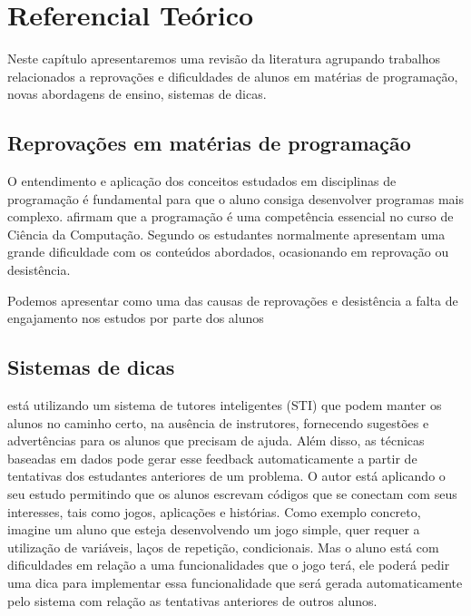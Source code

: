\chapter{Referencial Teórico}

Neste capítulo apresentaremos uma revisão da literatura agrupando trabalhos relacionados a reprovações e dificuldades de alunos em matérias de programação, novas abordagens de ensino, sistemas de dicas. 

\section{Reprovações em matérias de programação}

O entendimento e aplicação dos conceitos estudados em disciplinas de programação é fundamental para que o aluno consiga desenvolver programas mais complexo.  afirmam que a programação é uma competência essencial no curso de Ciência da Computação. Segundo  os estudantes normalmente apresentam uma grande dificuldade com os conteúdos abordados, ocasionando em reprovação ou desistência.

Podemos apresentar como uma das causas de reprovações e desistência a falta de engajamento nos estudos por parte dos alunos \cite{Sinclair:2015:MSE:2729094.2742586}

\section{Sistemas de dicas}

 está utilizando um sistema de tutores inteligentes (STI) que podem manter os alunos no caminho certo, na ausência de instrutores, fornecendo sugestões e advertências para os alunos que precisam de ajuda. Além disso, as técnicas baseadas em dados pode gerar esse feedback automaticamente a partir de tentativas dos estudantes anteriores de um problema. O autor está aplicando o seu estudo permitindo que os alunos escrevam códigos que se conectam com seus interesses, tais como jogos, aplicações e histórias. Como exemplo concreto, imagine um aluno que esteja desenvolvendo um jogo simple, quer requer a utilização de variáveis, laços de repetição, condicionais. Mas o aluno está com dificuldades em relação a uma funcionalidades que o jogo terá, ele poderá pedir uma dica para implementar essa funcionalidade que será gerada automaticamente pelo sistema com relação as tentativas anteriores de outros alunos.


